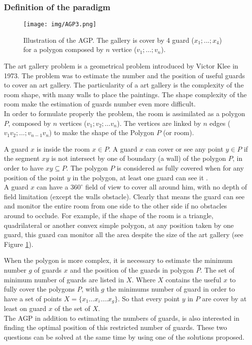 	\subsubsection{Definition of the paradigm} \label{sec:AGPdef}
	\begin{figure}[t!]
\center
{}
   \texttt{[image: img/AGP3.png]}
  \caption{Illustration of the AGP. The gallery is cover by  4 guard ($x_1;...;x_4$) for a polygon  composed by $n$ vertice ($v_1;...;v_n$).}\label{fig:AGP}
  \endminipage\hfill
\end{figure}
	The art gallery problem is a geometrical problem introduced by Victor Klee in 1973. The problem was to estimate the number and the position of useful guards to cover an art gallery. 
The particularity of a art gallery is the complexity of the room shape, with many walls to place the paintings. The shape complexity of the room make the estimation of guards number even more difficult.\\
In order to formulate properly the problem, the room is assimilated as a polygon $P$, composed by $n$ vertices ($v_1; v_2;…v_n$). The vertices are linked by $n$ edges ($v_1 v_2;…; v_{n-1} v_n$) to make the shape of the Polygon $P$ (or room).

A guard $x$ is inside the room $x \in P$. A guard $x$ can cover or see any point $y \in P$ if the segment $xy$ is not intersect by one of boundary (a wall) of the polygon $P$, in order to have $ xy \subseteq P$.
The polygon $P$ is considered as fully covered when for any position of the point $y$ in the polygon, at least one guard can see it .\\
A guard $x$ can have a $360^\circ$ field of view to cover all around him, with no depth of field limitation (except the walls obstacle). Clearly that means the guard can see and monitor the entire room from one side to the other side if no obstacles around to occlude. For example, if the shape of the room is a triangle, quadrilateral or another convex simple polygon, at any position taken by one guard, this guard can monitor all the area despite the size of the art gallery (see Figure \ref{fig:AGP}). 

When the polygon is more complex, it is necessary to estimate the minimum number $g$ of guards $x$ and the position of the guards in polygon $P$. 
 The set of minimum number of guards are listed in $X$. Where $X$ contains the useful $x$ to fully cover the polygons $P$, with $g$ the minimums number of guard in order to have a set of points $X=\{x_1…x_i…. x_g\}$. So that every point $y$ in $P$  are cover by at least on guard $x$ of the set of $X$. \\
The AGP in addition to estimating the numbers of guards,  is also interested in finding the optimal position of this restricted number of guards. 
These two questions can be solved at the same time by using one of the solutions proposed.


